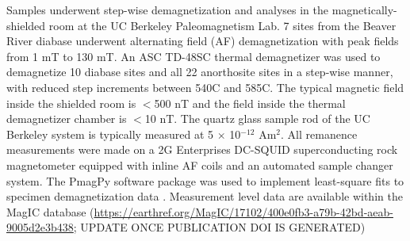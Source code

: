 \documentclass[draft]{agujournal2019}
\begin{document}
Samples underwent step-wise demagnetization and analyses in the magnetically-shielded room at the UC Berkeley Paleomagnetism Lab. 7 sites from the Beaver River diabase underwent alternating field (AF) demagnetization with peak fields from 1 mT to 130 mT. An ASC TD-48SC thermal demagnetizer was used to demagnetize 10 diabase sites and all 22 anorthosite sites in a step-wise manner, with reduced step increments between 540\textdegree C and 585\textdegree C. The typical magnetic field inside the shielded room is $<$500 nT and the field inside the thermal demagnetizer chamber is $<$10 nT. The quartz glass sample rod of the UC Berkeley system is typically measured at 5 $\times$ 10$^{-12}$ Am$^{2}$. All remanence measurements were made on a 2G Enterprises DC-SQUID superconducting rock magnetometer equipped with inline AF coils and an automated sample changer system. The PmagPy software package was used to implement least-square fits to specimen demagnetization data \cite{Tauxe2016a}. Measurement level data are available within the MagIC database (\url{https://earthref.org/MagIC/17102/400e0fb3-a79b-42bd-aeab-9005d2e3b438}; UPDATE ONCE PUBLICATION DOI IS GENERATED)
\end{document}
